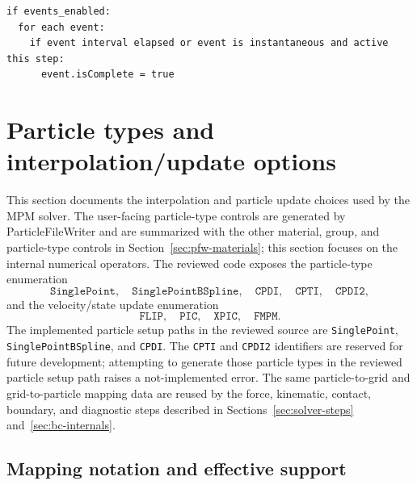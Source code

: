 \begin{lstlisting}[caption={Event-completion update.},basicstyle=\ttfamily\small]
if events_enabled:
  for each event:
    if event interval elapsed or event is instantaneous and active this step:
      event.isComplete = true
\end{lstlisting}





\section{Particle types and interpolation/update options}
\label{sec:particle-types-and-mapping}

This section documents the interpolation and particle update choices used by the MPM solver.  The user-facing particle-type controls are generated by ParticleFileWriter and are summarized with the other material, group, and particle-type controls in Section~\ref{sec:pfw-materials}; this section focuses on the internal numerical operators.  The reviewed code exposes the particle-type enumeration
\begin{equation}
  \texttt{SinglePoint},\quad
  \texttt{SinglePointBSpline},\quad
  \texttt{CPDI},\quad
  \texttt{CPTI},\quad
  \texttt{CPDI2},
\end{equation}
and the velocity/state update enumeration
\begin{equation}
  \texttt{FLIP},\quad \texttt{PIC},\quad \texttt{XPIC},\quad \texttt{FMPM}.
\end{equation}
The implemented particle setup paths in the reviewed source are \texttt{SinglePoint}, \texttt{SinglePointBSpline}, and \texttt{CPDI}.  The \texttt{CPTI} and \texttt{CPDI2} identifiers are reserved for future development; attempting to generate those particle types in the reviewed particle setup path raises a not-implemented error.  The same particle-to-grid and grid-to-particle mapping data are reused by the force, kinematic, contact, boundary, and diagnostic steps described in Sections~\ref{sec:solver-steps} and~\ref{sec:bc-internals}.

\subsection{Mapping notation and effective support}
\label{subsec:mapping-notation}

